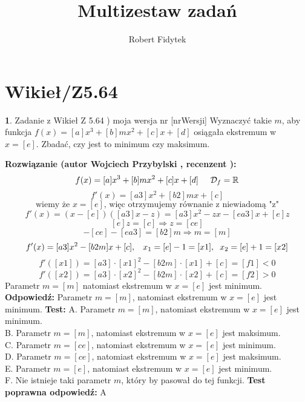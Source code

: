 \documentclass[12pt, a4paper]{article}
\title{Multizestaw zadań}
\author{Robert Fidytek}
\date{}
\theoremstyle{definition} %
\newtheorem{zad}{}
\newcommand{\kategoria}[1]{\section{#1}} %
\newcommand{\zadStart}[1]{\begin{zad}#1\newline} %
\newcommand{\zadStop}{\end{zad}}   %
\newcommand{\rozwStart}[2]{\noindent \textbf{Rozwiązanie (autor #1 , recenzent #2): }\newline} %
\newcommand{\rozwStop}{\newline}                                            %
\newcommand{\odpStart}{\noindent \textbf{Odpowiedź:}\newline}    %
\newcommand{\odpStop}{\newline}                                             %
\newcommand{\testStart}{\noindent \textbf{Test:}\newline} %
\newcommand{\testStop}{\newline} %
\newcommand{\kluczStart}{\noindent \textbf{Test poprawna odpowiedź:}\newline} %
\newcommand{\kluczStop}{\newline} %
\begin{document}
\maketitle


\kategoria{Wikieł/Z5.64}
\zadStart{Zadanie z Wikieł Z 5.64 ) moja wersja nr [nrWersji]}
Wyznaczyć takie $m$, aby funkcja $f(x)=[a]x^{3}+[b]mx^{2}+[c]x+[d]$ osiągała ekstremum w $x=[e]$. Zbadać, czy jest to minimum czy maksimum.
\zadStop
\rozwStart{Wojciech Przybylski}{}
$$ f(x)=[a]x^{3}+[b]mx^{2}+[c]x+[d]\hspace{5mm} \mathcal{D}_{f}=\mathbb{R}$$
$$ f'(x)=[a3]x^{2}+[b2]mx+[c]$$
$$\mbox{ wiemy że } x=[e] \mbox{, więc otrzymujemy równanie z niewiadomą "z" }$$
$$f'(x)=(x-[e])([a3]x-z)=[a3]x^{2}-zx-[ea3]x+[e]z$$
$$[e]z=[c]\Rightarrow z=[ce]$$
$$-[ce]-[ea3]=[b2]m \Rightarrow m=[m]$$
$$f'(x)=[a3]x^{2}-[b2m]x+[c],\hspace{3mm}x_{1}=[e]-1=[x1],\hspace{2mm} x_{2}=[e]+1=[x2]$$
$$f'([x1])=[a3]\cdot[x1]^{2}-[b2m]\cdot[x1]+[c]=[f1]<0$$
$$f'([x2])=[a3]\cdot[x2]^{2}-[b2m]\cdot[x2]+[c]=[f2]>0$$
Parametr $m=[m]$ natomiast ekstremum w $x=[e]$ jest minimum.
\rozwStop
\odpStart
Parametr $m=[m]$, natomiast ekstremum w $x=[e]$ jest minimum.
\odpStop
\testStart
A. Parametr $m=[m]$, natomiast ekstremum w $x=[e]$ jest minimum.\\
B. Parametr $m=[m]$, natomiast ekstremum w $x=[e]$ jest maksimum.\\
C. Parametr $m=[ce]$, natomiast ekstremum w $x=[e]$ jest minimum.\\
D. Parametr $m=[ce]$, natomiast ekstremum w $x=[e]$ jest maksimum.\\
E. Parametr $m=[e]$, natomiast ekstremum w $x=[e]$ jest minimum.\\
F. Nie istnieje taki parametr $m$, który by pasował do tej funkcji.
\testStop
\kluczStart
A
\kluczStop
\end{document}
